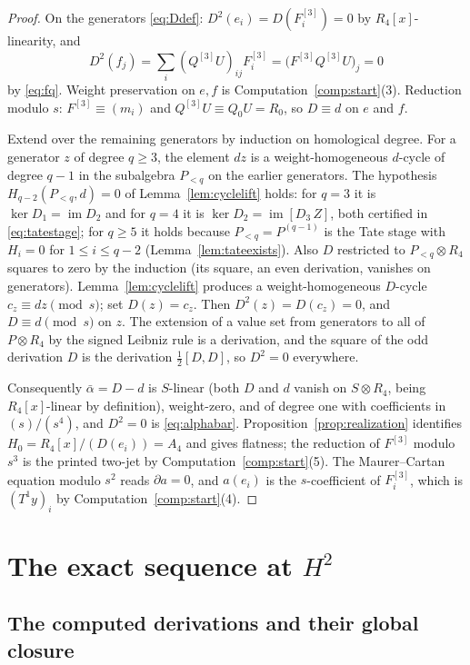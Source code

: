 \documentclass[11pt]{article}
\theoremstyle{definition}
\theoremstyle{remark}
\newcommand{\im}{\operatorname{im}}
\begin{document}
\begin{proof}
On the generators \eqref{eq:Ddef}: $D^2(e_i)=D(F^{[3]}_i)=0$ by
$R_4[x]$-linearity, and
\[
 D^2(f_j)=\sum_i(Q^{[3]}U)_{ij}F^{[3]}_i
 =\bigl(F^{[3]}Q^{[3]}U\bigr)_j=0
\]
by \eqref{eq:fq}.  Weight preservation on $e,f$ is
Computation~\ref{comp:start}(3).  Reduction modulo $s$: $F^{[3]}\equiv
(m_i)$ and $Q^{[3]}U\equiv Q_0U=R_0$, so $D\equiv d$ on $e$ and $f$.

Extend over the remaining generators by induction on homological degree.
For a generator $z$ of degree $q\geq3$, the element $dz$ is a
weight-homogeneous $d$-cycle of degree $q-1$ in the subalgebra $P_{<q}$
on the earlier generators.  The hypothesis $H_{q-2}(P_{<q},d)=0$ of
Lemma~\ref{lem:cyclelift} holds: for $q=3$ it is
$\ker D_1=\im D_2$ and for $q=4$ it is $\ker D_2=\im[D_3\,Z]$, both
certified in \eqref{eq:tatestage}; for $q\geq5$ it holds because
$P_{<q}=P^{(q-1)}$ is the Tate stage with $H_i=0$ for $1\leq i\leq q-2$
(Lemma~\ref{lem:tateexists}).  Also $D$ restricted to $P_{<q}\otimes R_4$
squares to zero by the induction (its square, an even derivation, vanishes
on generators).  Lemma~\ref{lem:cyclelift} produces a weight-homogeneous
$D$-cycle $c_z\equiv dz\pmod s$; set $D(z)=c_z$.  Then $D^2(z)=D(c_z)=0$,
and $D\equiv d\pmod s$ on $z$.  The extension of a value set from
generators to all of $P\otimes R_4$ by the signed Leibniz rule is a
derivation, and the square of the odd derivation $D$ is the derivation
$\tfrac12[D,D]$, so $D^2=0$ everywhere.

Consequently $\bar\alpha=D-d$ is $S$-linear (both $D$ and $d$ vanish on
$S\otimes R_4$, being $R_4[x]$-linear by definition),
weight-zero, and of degree one with coefficients in $(s)/(s^4)$, and
$D^2=0$ is \eqref{eq:alphabar}.  Proposition~\ref{prop:realization}
identifies $H_0=R_4[x]/(D(e_i))=A_4$ and gives flatness; the reduction of
$F^{[3]}$ modulo $s^3$ is the printed two-jet by
Computation~\ref{comp:start}(5).  The Maurer--Cartan equation modulo $s^2$
reads $\partial a=0$, and $a(e_i)$ is the $s$-coefficient of
$F^{[3]}_i$, which is $(T^1y)_i$ by Computation~\ref{comp:start}(4).
\end{proof}

\section{The exact sequence at $H^2$}\label{sec:exact}

\subsection{The computed derivations and their global closure}
\end{document}
